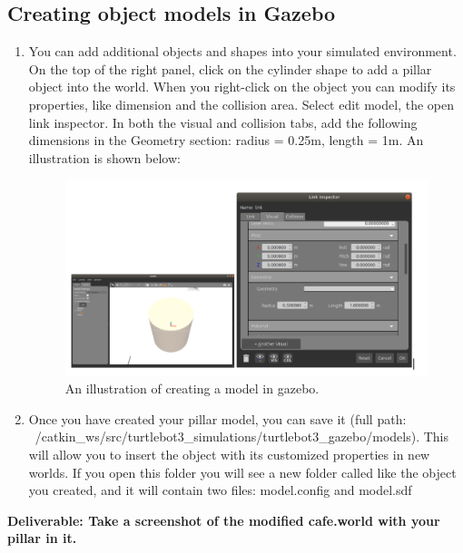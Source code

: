 \documentclass[12pt]{article}
\begin{document}
\subsection{Creating object models in Gazebo}
\begin{enumerate}
    \item You can add additional objects and shapes into your simulated environment. On the top of the right panel, click on the cylinder shape to add a pillar object into the world. When you right-click on the object you can modify its properties, like dimension and the collision area. Select edit model, the open link inspector. In both the visual and collision tabs, add the following dimensions in the Geometry section: radius = 0.25m, length = 1m. An illustration is shown below:
    
\begin{figure}[H]
  \vspace{-10pt}
  \centering\includegraphics[width=14cm]{lab1figure/lab1gazebodemo.png}\vspace{-10pt}
  \caption{An illustration of creating a model in gazebo.}\label{fig:omni1}
  \end{figure}
    
    \item Once you have created your pillar model, you can save it (full path:\\ ~/catkin\_ws/src/turtlebot3\_simulations/turtlebot3\_gazebo/models). This will allow you to insert the object with its customized properties in new worlds. If you open this folder you will see a new folder called like the object you created, and it will contain two files: model.config and model.sdf
\end{enumerate}

\textbf{Deliverable: Take a screenshot of the modified cafe.world with your pillar in it.}
\end{document}
